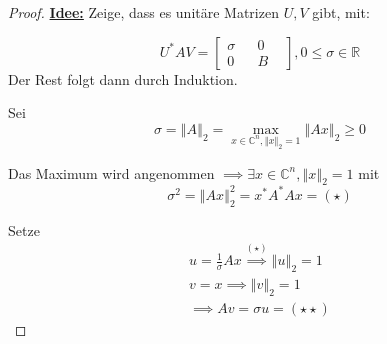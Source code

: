 \documentclass{book}
\def\C{\mathbb{C}}
\def\R{\mathbb{R}}
\begin{document}
            \begin{proof}
                \underline{\textbf{Idee:}} Zeige, dass es unitäre Matrizen $U,V$ gibt, mit:
                
                \begin{equation}\label{g4.7}
                    U^* A V = \begin{bmatrix}
                        \sigma & &0&\\
                        0 & & B &
                    \end{bmatrix}, 0\leq \sigma\in \R
                \end{equation}
                Der Rest folgt dann durch Induktion.

                Sei \[\sigma = \left\Vert A \right\Vert_2=\max_{x\in\C^n, \left\Vert x \right\Vert_2=1}\left\Vert Ax \right\Vert_2\geq 0\]
            
                Das Maximum wird angenommen $\implies\exists x\in\C^n, \left\Vert x \right\Vert_2=1$ mit 
                \[\sigma^2 = \left\Vert Ax \right\Vert_2^2=x^*A^*Ax = (\star)\]

                Setze 
                \begin{align*}
                    u=\frac{1}{\sigma}Ax \stackrel{(\star)}{\implies} \left\Vert u \right\Vert_2=1\\
                    v=x \implies \left\Vert v \right\Vert_2=1\\
                    \implies Av=\sigma u = (\star \star)
                \end{align*}


\end{proof}
\end{document}
